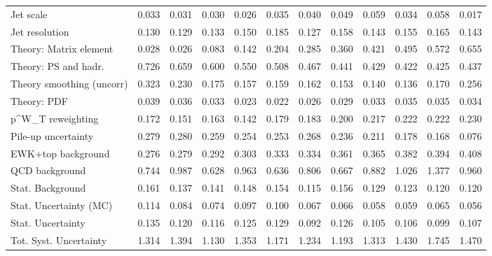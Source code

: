 \begin{tabular}{l|p{0.6cm}p{0.6cm}p{0.6cm}p{0.6cm}p{0.6cm}p{0.6cm}p{0.6cm}p{0.6cm}p{0.6cm}p{0.6cm}p{0.6cm}}
Jet scale                                & 0.033 & 0.031 & 0.030 & 0.026 & 0.035 & 0.040 & 0.049 & 0.059 & 0.034 & 0.058 & 0.017 \\
Jet resolution                           & 0.130 & 0.129 & 0.133 & 0.150 & 0.185 & 0.127 & 0.158 & 0.143 & 0.155 & 0.165 & 0.143 \\
Theory: Matrix element                   & 0.028 & 0.026 & 0.083 & 0.142 & 0.204 & 0.285 & 0.360 & 0.421 & 0.495 & 0.572 & 0.655 \\
Theory: PS and hadr.                     & 0.726 & 0.659 & 0.600 & 0.550 & 0.508 & 0.467 & 0.441 & 0.429 & 0.422 & 0.425 & 0.437 \\
Theory smoothing (uncorr)                & 0.323 & 0.230 & 0.175 & 0.157 & 0.159 & 0.162 & 0.153 & 0.140 & 0.136 & 0.170 & 0.256 \\
Theory: PDF                              & 0.039 & 0.036 & 0.033 & 0.023 & 0.022 & 0.026 & 0.029 & 0.033 & 0.035 & 0.035 & 0.034 \\
p^{W}_{T} reweighting                    & 0.172 & 0.151 & 0.163 & 0.142 & 0.179 & 0.183 & 0.200 & 0.217 & 0.222 & 0.222 & 0.230 \\
Pile-up uncertainty                      & 0.279 & 0.280 & 0.259 & 0.254 & 0.253 & 0.268 & 0.236 & 0.211 & 0.178 & 0.168 & 0.076 \\
EWK+top background                       & 0.276 & 0.279 & 0.292 & 0.303 & 0.333 & 0.334 & 0.361 & 0.365 & 0.382 & 0.394 & 0.408 \\
QCD background                           & 0.744 & 0.987 & 0.628 & 0.963 & 0.636 & 0.806 & 0.667 & 0.882 & 1.026 & 1.377 & 0.960 \\
Stat. Background                         & 0.161 & 0.137 & 0.141 & 0.148 & 0.154 & 0.115 & 0.156 & 0.129 & 0.123 & 0.120 & 0.120 \\
Stat. Uncertainty (MC)                   & 0.114 & 0.084 & 0.074 & 0.097 & 0.100 & 0.067 & 0.066 & 0.058 & 0.059 & 0.065 & 0.056 \\
\hline
Stat. Uncertainty                        & 0.135 & 0.120 & 0.116 & 0.125 & 0.129 & 0.092 & 0.126 & 0.105 & 0.106 & 0.099 & 0.107 \\
\hline
Tot. Syst. Uncertainty                   & 1.314 & 1.394 & 1.130 & 1.353 & 1.171 & 1.234 & 1.193 & 1.313 & 1.430 & 1.745 & 1.470 \\
\hline
\end{tabular}
